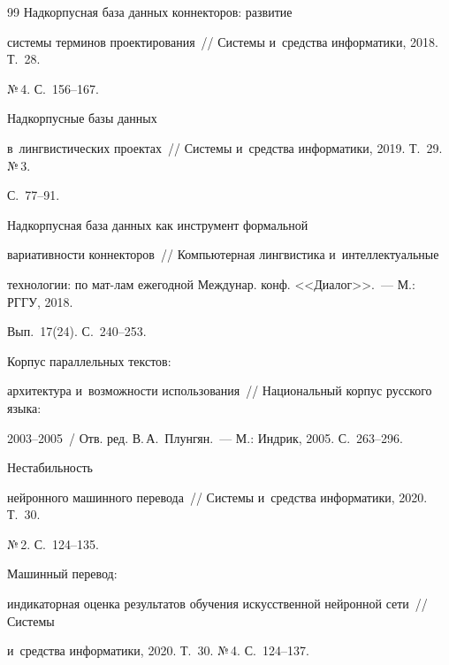 {{\begin{thebibliography}{99}
 Надкорпусная база данных коннекторов: развитие 


сис\-те\-мы терминов проектирования~/\!\!/ Сис\-те\-мы и~средства информатики, 2018. Т.~28. 


№\,4. С.~156--167.







 Надкорпусные базы данных 


в~лингвистических проектах~/\!\!/ Системы и~средства информатики, 2019. Т.~29. №\,3. 


С.~77--91.







 Надкорпусная база данных как инструмент формальной 


вариативности коннекторов~/\!\!/ Компьютерная лингвистика и~интеллектуальные 


технологии: по мат-лам ежегодной Междунар. конф. <<Диалог>>.~--- М.: РГГУ, 2018. 


Вып.~17(24). С.~240--253.




 Корпус параллельных текс\-тов: 


архитектура и~воз\-мож\-ности использования~/\!\!/ Национальный корпус русского языка: 


2003--2005~/ Отв. ред. В.\,А.~Плунгян.~--- М.: Индрик, 2005. С.~263--296.




 Нестабильность 


нейронного машинного перевода~/\!\!/ Сис\-те\-мы и~средства информатики, 2020. Т.~30. 


№\,2. С.~124--135.




 Машинный перевод: 


индикаторная оценка результатов обучения искусственной нейронной сети~/\!\!/ Сис\-те\-мы 


и~средства информатики, 2020. Т.~30. №\,4. С.~124--137.





\end{thebibliography}}}
